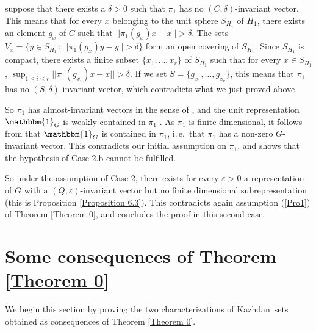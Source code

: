 \documentclass[11pt,english,a4paper]{smfart}
\numberwithin{equation}{section}
\theoremstyle{definition}
\begin{document}
suppose that there exists a $\delta >0$ such that $\pi _{1}$ has no 
$(C,\delta )$-invariant vector. This means that for every $x$ belonging 
to the unit sphere 
$S_{H_{1} } $ of $H_{1}$, there exists an element $g_{x}$ of $C$ such that 
$||\pi _{1}(g_{x})x-x||>\delta $. The sets 
$V_{x}=\{y\in S_{H_{1}}\,;\,||\pi _{1}(g_{x})y-y||>\delta \}$ form an open 
covering of $S_{H_{1}}$. Since $S_{H_{1}}$ is compact, there exists a 
finite 
subset $\{x_{1},\dots,x_{r}\}$ of $S_{H_{1}}$ such that for every $x\in
S_{H_{1}}$, $\sup_{1\le i\le r}||\pi _{1}(g_{x_{i}})x-x||>\delta $. If we 
set $S=\{g_{x_{1}},\dots,g_{x_{r}}\}$, this means that $\pi 
_{1}$ has no $(S,\delta )$-invariant vector, which contradicts what we 
just proved above.
\par\smallskip 
So $\pi _{1}$ has almost-invariant vectors in the sense of
\cite[Def.~1.1.1]{BdHV}, and the unit representation $\mathbbm{1}_{G}$ 
is weakly contained in $\pi _{1}$ \cite[Cor.~F.1.5]{BdHV}. As $\pi 
_{1}$ is finite dimensional, it follows from \cite[Cor.~F.2.9]{BdHV} that 
$\mathbbm{1}_{G}$ is contained in $\pi _{1}$, i.\,e.\ that $\pi _{1}$ has a 
non-zero $G$-invariant vector. This contradicts our initial assumption on 
$\pi _{1}$, and shows that the hypothesis of Case 2.b cannot be fulfilled.
\par\smallskip
So under the assumption of Case 2, there exists for every $\varepsilon 
>0$ a representation of $G$ with a $(Q,\varepsilon )$-invariant vector but 
no finite dimensional subrepresentation (this is Proposition \ref{Proposition 
6.3}). This contradicts again assumption (\ref{Pro1}) of Theorem 
\ref{Theorem 0}, and concludes the proof in this second case.

 \section{Some consequences of Theorem \ref{Theorem 0}}\label{Section 6}
 We begin this section by proving the two characterizations of {Kazhdan}\ sets obtained as consequences of Theorem \ref{Theorem 0}.
 
\end{document}
